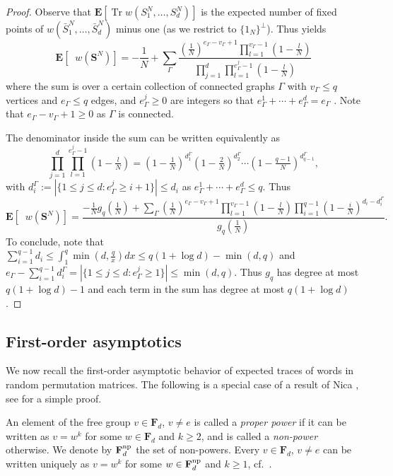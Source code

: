\documentclass[10pt,reqno]{amsart}
\theoremstyle{definition}
\theoremstyle{remark}
\numberwithin{equation}{section}
\numberwithin{figure}{section}
\numberwithin{table}{section}
\newcommand{\tr}{\mathop{\mathrm{Tr}}}
\newcommand{\ntrN}{\mathop{\mathrm{tr}_N}}
\begin{document}
\begin{proof}
Observe that $\mathbf{E}[\tr w(S_1^N,\ldots,S_d^N)]$ is the expected number
of fixed points of $w(\bar S_1^N,\ldots,\bar S_d^N)$ minus one (as we
restrict to $\{1_N\}^\perp$). Thus \cite[eq.\ (7)]{PL10} yields
$$
        \mathbf{E}[\ntrN w(\boldsymbol{S}^N)] =
	-\frac{1}{N} +
        \sum_\Gamma
        \frac{
        (\frac{1}{N})^{e_\Gamma-v_\Gamma+1}
        \prod_{l=1}^{v_\Gamma-1}(1-\frac{l}{N})}
        {\prod_{j=1}^d \prod_{l=1}^{e_\Gamma^j-1} (1-\frac{l}{N})}
$$
where the sum is over a certain collection of connected graphs $\Gamma$ 
with $v_\Gamma \le q$ vertices and $e_\Gamma\le q$ edges, and 
$e_\Gamma^j\ge 0$ are integers so that 
$e_\Gamma^1+\cdots+e_\Gamma^d=e_\Gamma$ \cite[p.\ 105]{PL10}. Note that 
$e_\Gamma - v_\Gamma+1\ge 0$ as $\Gamma$ is connected.

The denominator inside the sum can be written equivalently as
$$
	{\textstyle
        \prod_{j=1}^d \prod_{l=1}^{e_\Gamma^j-1} (1-\tfrac{l}{N})
        =
        (1-\tfrac{1}{N})^{d_1^\Gamma} 
        (1-\tfrac{2}{N})^{d_2^\Gamma} \cdots
        (1-\tfrac{q-1}{N})^{d_{q-1}^\Gamma}
	},
$$
with $d_i^\Gamma := |\{1\le j\le d: e_\Gamma^j \ge i+1\}|\le d_i$ as
$e_\Gamma^1+\cdots+e_\Gamma^d\le q$. Thus
$$
        \mathbf{E}[\ntrN w(\boldsymbol{S}^N)] =
	\frac{
	-\frac{1}{N}g_q(\frac{1}{N})
        +\sum_\Gamma
        (\frac{1}{N})^{e_\Gamma-v_\Gamma+1}
        \prod_{l=1}^{v_\Gamma-1}(1-\frac{l}{N})
	\prod_{i=1}^{q-1}
	(1-\frac{i}{N})^{d_i-d_i^\Gamma}
	}{
	g_q(\frac{1}{N})}.
$$
To conclude, note that $\sum_{i=1}^{q-1} 
d_i \le \int_1^q \min(d,\frac{q}{x}) dx \le q(1+\log d) - \min(d,q)$
and $e_\Gamma - \sum_{i=1}^{q-1} d_i^\Gamma =
|\{1\le j\le d:e_\Gamma^j\ge 1\}| \le \min(d,q)$. Thus $g_q$ has degree
at most $q(1+\log d)-1$ and each term in the sum has degree at most
$q(1+\log d)$.
\end{proof}

\subsection{First-order asymptotics}
\label{sec:lowasymp}

We now recall the first-order asymptotic behavior of expected traces of 
words in random permutation matrices. The following is a special case of a 
result of Nica \cite{Nic94}, see \cite[p.\ 124]{PL10} for a simple proof.

An element of the free group $v\in\mathbf{F}_d$, $v\ne e$ is 
called a \emph{proper power} if it can be written as $v=w^k$ for some 
$w\in\mathbf{F}_d$ and $k\ge 2$, and is called a \emph{non-power} otherwise.
We denote by $\mathbf{F}_d^{\rm np}$ the set of non-powers. 
Every $v\in\mathbf{F}_d$, $v\ne e$ can be 
written uniquely as $v=w^k$ for some $w\in\mathbf{F}_d^{\rm np}$ and $k\ge 
1$, cf.\ \cite[Proposition I.2.17]{LS01}.
\end{document}
